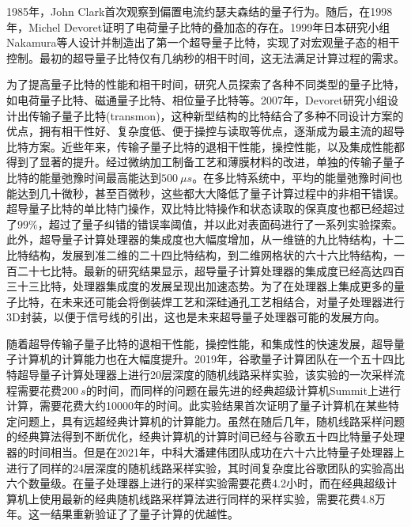 1985年，John Clark首次观察到偏置电流约瑟夫森结的量子行为\cite{devoret1985measurements}。随后，在1998年，Michel Devoret证明了电荷量子比特的叠加态的存在\cite{bouchiat1998quantum}。1999年日本研究小组 Nakamura等人设计并制造出了第一个超导量子比特，实现了对宏观量子态的相干控制\cite{nakamura1999coherent}。最初的超导量子比特仅有几纳秒的相干时间，这无法满足计算过程的需求\cite{nakamura1999coherent}。

为了提高量子比特的性能和相干时间，研究人员探索了各种不同类型的量子比特，如电荷量子比特\cite{vion2002manipulating}、磁通量子比特\cite{chiorescu2003coherent}、相位量子比特\cite{simmonds2004decoherence}等。2007年，Devoret研究小组设计出传输子量子比特(transmon)\cite{koch2007charge}，这种新型结构的比特结合了多种不同设计方案的优点，拥有相干性好、复杂度低、便于操控与读取等优点，逐渐成为最主流的超导比特方案。近些年来，传输子量子比特的退相干性能，操控性能，以及集成性能都得到了显著的提升\cite{arute2019quantum,wu2021strong}。经过微纳加工制备工艺和薄膜材料的改进，单独的传输子量子比特的能量弛豫时间最高能达到$500\ {\mu s}$\cite{place2021new,wang2021transmon}。在多比特系统中，平均的能量弛豫时间也能达到几十微秒\cite{zhu2022quantum,krinner2021realizing,guo2021stark}，甚至百微秒\cite{jurcevic2021demonstration}，这些都大大降低了量子计算过程中的非相干错误。超导量子比特的单比特门操作，双比特比特操作和状态读取的保真度也都已经超过了$99\%$\cite{li2019realisation,walter2017rapid,sunada2022fast}，超过了量子纠错的错误率阈值，并以此对表面码进行了一系列实验探索。此外，超导量子计算处理器的集成度也大幅度增加，从一维链的九比特结构\cite{kelly2015state}，十二比特结构\cite{yan2019strongly,zha2020ergodic}，发展到准二维的二十四比特结构\cite{chen2021observation}，到二维网格状的六十六比特结构\cite{wu2021strong,zhu2022quantum}，一百二十七比特。最新的研究结果显示，超导量子计算处理器的集成度已经高达四百三十三比特\cite{IBMQuantum2022}，处理器集成度的发展呈现出加速态势。为了在处理器上集成更多的量子比特，在未来还可能会将倒装焊工艺和深硅通孔工艺相结合，对量子处理器进行3D封装\cite{mallek2021fabrication,rosenberg20193d,vahidpour2017superconducting}，以便于信号线的引出，这也是未来超导量子处理器可能的发展方向。

随着超导传输子量子比特的退相干性能，操控性能，和集成性的快速发展，超导量子计算机的计算能力也在大幅度提升。2019年，谷歌量子计算团队在一个五十四比特超导量子计算处理器上进行20层深度的随机线路采样实验\cite{arute2019quantum}，该实验的一次采样流程需要花费$200\ {s}$的时间，而同样的问题在最先进的经典超级计算机Summit上进行计算，需要花费大约10000年的时间。此实验结果首次证明了量子计算机在某些特定问题上，具有远超经典计算机的计算能力。虽然在随后几年，随机线路采样问题的经典算法得到不断优化，经典计算机的计算时间已经与谷歌五十四比特量子处理器的时间相当\cite{guo2021verifying}。但是在2021年，中科大潘建伟团队成功在六十六比特量子处理器上进行了同样的24层深度的随机线路采样实验，其时间复杂度比谷歌团队的实验高出六个数量级。在量子处理器上进行的采样实验需要花费4.2小时，而在经典超级计算机上使用最新的经典随机线路采样算法进行同样的采样实验，需要花费4.8万年\cite{zhu2022quantum}。这一结果重新验证了了量子计算的优越性。

